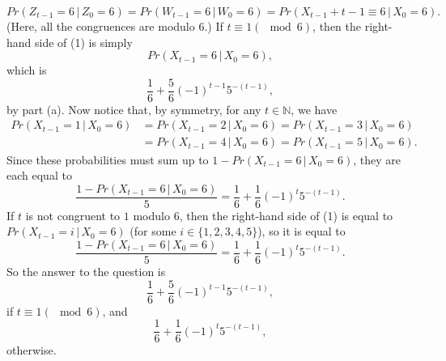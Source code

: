 \documentclass[11pt,a4paper]{report}
\begin{document}
\begin{enumerate}
\begin{enumerate}
            \begin{equation}
                Pr(Z_{t-1}=6\, | \, Z_0=6) = Pr(W_{t-1} = 6\, |\, W_0=6) = Pr(X_{t-1}+t-1\equiv 6\, |\, X_0 = 6).
            \end{equation}
            (Here, all the congruences are modulo $6$.) If $t \equiv 1 (\mod{6})$, then the right-hand side of (1) is simply $$Pr(X_{t-1} = 6\, |\, X_0=6),$$ which is $$\frac{1}{6}+\frac{5}{6}(-1)^{t-1}5^{-(t-1)},$$ by part (a). Now notice that, by symmetry, for any $t \in \mathbb{N}$, we have
            \begin{align*}
                Pr(X_{t−1} = 1\, |\, X_0 = 6) &= Pr(X_{t−1} = 2\,|\, X_0 = 6) = Pr(X_{t−1} = 3\,|\,X_0 = 6)\\
                &=  Pr(X_{t−1} = 4\, |\, X_0 = 6) = Pr(X_{t−1} = 5\, |\, X_0 = 6).
            \end{align*}
            Since these probabilities must sum up to $1 − Pr(X_{t−1} = 6\, |\, X_0 = 6)$, they are each equal to $$\frac{1 − Pr(X_{t−1} = 6\, |\, X_0 = 6)}{5}=\frac{1}{6}+\frac{1}{6}(-1)^t5^{-(t-1)}.$$
            If $t$ is not congruent to $1$ modulo $6$, then the right-hand side of (1) is equal to $Pr(X_{t−1} = i\, |\, X_0 = 6)$ (for some $i \in \{1, 2, 3, 4, 5\}$), so it is equal to $$\frac{1 − Pr(X_{t−1} = 6\, |\, X_0 = 6)}{5}=\frac{1}{6}+\frac{1}{6}(-1)^t5^{-(t-1)}.$$ So the answer to the question is $$\frac{1}{6}+\frac{5}{6}(-1)^{t-1}5^{-(t-1)},$$ if $t\equiv 1(\mod{6})$, and $$\frac{1}{6}+\frac{1}{6}(-1)^t5^{-(t-1)},$$ otherwise.
        \end{enumerate}
    \end{enumerate}
\end{document}
